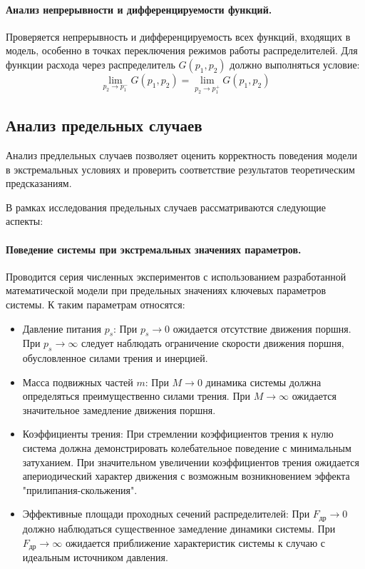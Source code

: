 \paragraph{Анализ непрерывности и дифференцируемости функций.}

Проверяется непрерывность и дифференцируемость всех функций, входящих в модель, особенно в точках переключения
режимов работы распределителей. Для функции расхода через распределитель $G(p_1, p_2)$ должно выполняться условие:
\begin{equation*}
    \lim_{p_2 \to p_1^-} G(p_1, p_2) = \lim_{p_2 \to p_1^+} G(p_1, p_2)
\end{equation*}

\subsection{Анализ предельных случаев}\label{sec:ch2/sec7/subsec3}

Анализ предлельных случаев позволяет оценить корректность поведения модели в экстремальных условиях
и проверить соответствие результатов теоретическим предсказаниям.

В рамках исследования предельных случаев рассматриваются следующие аспекты:

\paragraph{Поведение системы при экстремальных значениях параметров.}

Проводится серия численных экспериментов с использованием разработанной математической модели
при предельных значениях ключевых параметров системы. К таким параметрам относятся:
\begin{itemize}
    \item Давление питания $p_s$:
          При $p_s \rightarrow 0$ ожидается отсутствие движения поршня.
          При $p_s \rightarrow \infty$ следует наблюдать ограничение скорости движения поршня, обусловленное силами трения и инерцией.
    \item Масса подвижных частей $m$:
          При $M \rightarrow 0$ динамика системы должна определяться преимущественно силами трения.
          При $M \rightarrow \infty$ ожидается значительное замедление движения поршня.
    \item Коэффициенты трения:
          При стремлении коэффициентов трения к нулю система должна демонстрировать колебательное поведение с минимальным затуханием.
          При значительном увеличении коэффициентов трения ожидается апериодический характер движения с возможным возникновением эффекта "прилипания-скольжения".
    \item Эффективные площади проходных сечений распределителей:
          При $F_\text{др} \rightarrow 0$ должно наблюдаться существенное замедление динамики системы.
          При $F_\text{др} \rightarrow \infty$ ожидается приближение характеристик системы к случаю с идеальным источником давления.
\end{itemize}

